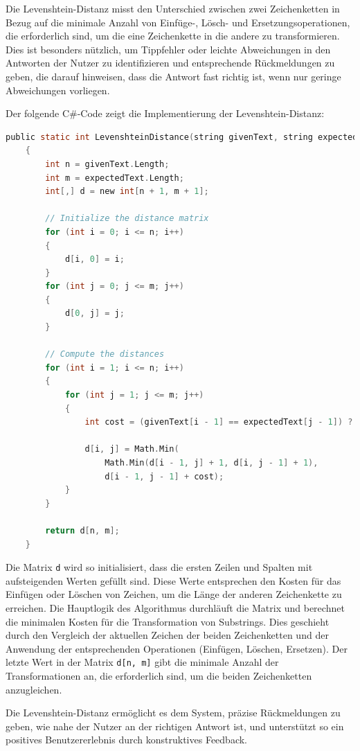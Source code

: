 Die Levenshtein-Distanz misst den Unterschied zwischen zwei Zeichenketten in Bezug auf die minimale Anzahl von Einfüge-, Lösch- und Ersetzungsoperationen, die erforderlich sind, um die eine Zeichenkette in die andere zu transformieren. Dies ist besonders nützlich, um Tippfehler oder leichte Abweichungen in den Antworten der Nutzer zu identifizieren und entsprechende Rückmeldungen zu geben, die darauf hinweisen, dass die Antwort fast richtig ist, wenn nur geringe Abweichungen vorliegen.

Der folgende C\#-Code zeigt die Implementierung der Levenshtein-Distanz:
\newpage
\begin{lstlisting}[language=c,caption={Code Ausschnitt zum Levenshtein Distanz Algorithmus in C\#}]
public static int LevenshteinDistance(string givenText, string expectedText)
    {
        int n = givenText.Length;
        int m = expectedText.Length;
        int[,] d = new int[n + 1, m + 1];

        // Initialize the distance matrix
        for (int i = 0; i <= n; i++)
        {
            d[i, 0] = i;
        }
        for (int j = 0; j <= m; j++)
        {
            d[0, j] = j;
        }

        // Compute the distances
        for (int i = 1; i <= n; i++)
        {
            for (int j = 1; j <= m; j++)
            {
                int cost = (givenText[i - 1] == expectedText[j - 1]) ? 0 : 1;

                d[i, j] = Math.Min(
                    Math.Min(d[i - 1, j] + 1, d[i, j - 1] + 1),
                    d[i - 1, j - 1] + cost);
            }
        }

        return d[n, m];
    }
\end{lstlisting}
Die Matrix \lstinline{d} wird so initialisiert, dass die ersten Zeilen und Spalten mit aufsteigenden Werten gefüllt sind. Diese Werte entsprechen den Kosten für das Einfügen oder Löschen von Zeichen, um die Länge der anderen Zeichenkette zu erreichen. Die Hauptlogik des Algorithmus durchläuft die Matrix und berechnet die minimalen Kosten für die Transformation von Substrings. Dies geschieht durch den Vergleich der aktuellen Zeichen der beiden Zeichenketten und der Anwendung der entsprechenden Operationen (Einfügen, Löschen, Ersetzen). Der letzte Wert in der Matrix \lstinline{d[n, m]} gibt die minimale Anzahl der Transformationen an, die erforderlich sind, um die beiden Zeichenketten anzugleichen.

Die Levenshtein-Distanz ermöglicht es dem System, präzise Rückmeldungen zu geben, wie nahe der Nutzer an der richtigen Antwort ist, und unterstützt so ein positives Benutzererlebnis durch konstruktives Feedback.

